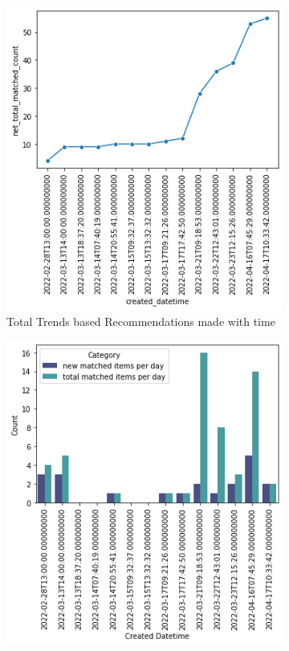 \documentclass[manuscript,natbib=false]{acmart}
\begin{document}
\begin{figure}[h]
     \centering
     \begin{subfigure}[b]{0.47\linewidth}
         \centering
         \includegraphics[width=\linewidth]{images/trends-matches-eval2.png}
         \caption{Total Trends based Recommendations made with time}
         \label{fig:trends-recsys-total-matches}
     \end{subfigure}
     \hfill
     \begin{subfigure}[b]{0.47\linewidth}
         \centering
         \includegraphics[width=\linewidth]{images/trends-matches-eval1.png}

\end{subfigure}
\end{figure}
\end{document}

